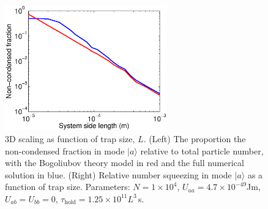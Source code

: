 \documentclass{iopart}
\begin{document}




\begin{figure}
  \centering
   \includegraphics[width=7cm]{figures/3D_Bog_mode_occupation_scaling.eps}
\caption{3D scaling as function of trap size, $L$. (Left) The proportion the non-condensed fraction in mode $|a\rangle$ relative to total particle number, with the Bogoliubov theory model in red and the full numerical solution in blue. (Right) Relative number squeezing in mode $|a\rangle$ as a function of trap size. Parameters: $N=1\times 10^4$, $U_{aa} = 4.7\times 10^{-49}$Jm, $U_{ab}=U_{bb}=0$, $\tau_{\mathrm{hold}} = 1.25 \times 10^{11} L^3$\,s.}
 \label{fig3D_Bog_mode_occupation_scaling}
\end{figure}
\end{document}
